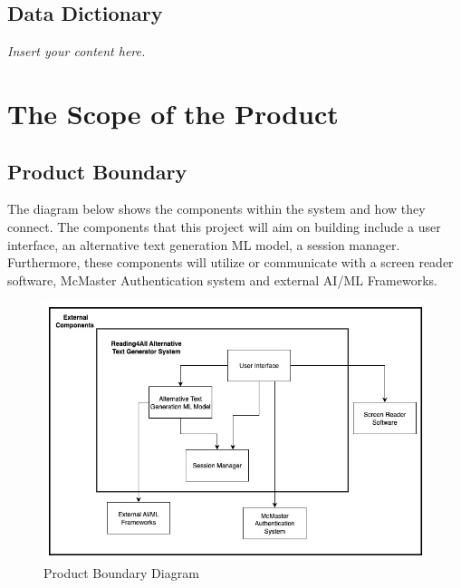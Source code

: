 \documentclass[12pt]{article}
\newcommand{\lips}{\textit{Insert your content here.}}
\begin{document}
\subsection{Data Dictionary}
\lips

\section{The Scope of the Product}
\subsection{Product Boundary}
The diagram below shows the components within the system and how they
connect. The components that this project will aim on building
include a user interface, an alternative text generation ML model, a
session manager. Furthermore, these components will utilize or
communicate with a screen reader software, McMaster Authentication
system and external AI/ML Frameworks.
\begin{figure}[H]
  \centering
  \includegraphics[width=1.0\textwidth]{Product_Boundary_Diagram.jpg}
  \caption{Product Boundary Diagram}
  \label{img:usecase}
\end{figure}
\end{document}
